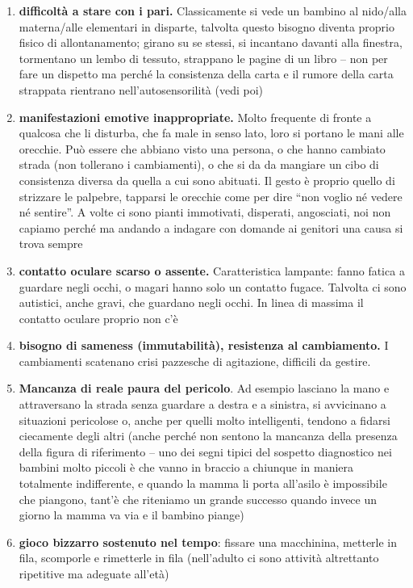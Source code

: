 \documentclass[]{article}
\begin{document}
\begin{enumerate}
\def\labelenumi{\arabic{enumi}.}
\item
  \textbf{difficoltà a stare con i pari.} Classicamente si vede un
  bambino al nido/alla materna/alle elementari in disparte, talvolta
  questo bisogno diventa proprio fisico di allontanamento; girano su se
  stessi, si incantano davanti alla finestra, tormentano un lembo di
  tessuto, strappano le pagine di un libro -- non per fare un dispetto
  ma perché la consistenza della carta e il rumore della carta strappata
  rientrano nell'autosensorilità (vedi poi)
\item
  \textbf{manifestazioni emotive inappropriate.} Molto frequente di
  fronte a qualcosa che li disturba, che fa male in senso lato, loro si
  portano le mani alle orecchie. Può essere che abbiano visto una
  persona, o che hanno cambiato strada (non tollerano i cambiamenti), o
  che si da da mangiare un cibo di consistenza diversa da quella a cui
  sono abituati. Il gesto è proprio quello di strizzare le palpebre,
  tapparsi le orecchie come per dire ``non voglio né vedere né
  sentire''. A volte ci sono pianti immotivati, disperati, angosciati,
  noi non capiamo perché ma andando a indagare con domande ai genitori
  una causa si trova sempre
\item
  \textbf{contatto oculare scarso o assente.} Caratteristica lampante:
  fanno fatica a guardare negli occhi, o magari hanno solo un contatto
  fugace. Talvolta ci sono autistici, anche gravi, che guardano negli
  occhi. In linea di massima il contatto oculare proprio non c'è
\item
  \textbf{bisogno di sameness (immutabilità), resistenza al
  cambiamento.} I cambiamenti scatenano crisi pazzesche di agitazione,
  difficili da gestire.
\item
  \textbf{Mancanza di reale paura del pericolo}. Ad esempio lasciano la
  mano e attraversano la strada senza guardare a destra e a sinistra, si
  avvicinano a situazioni pericolose o, anche per quelli molto
  intelligenti, tendono a fidarsi ciecamente degli altri (anche perché
  non sentono la mancanza della presenza della figura di riferimento --
  uno dei segni tipici del sospetto diagnostico nei bambini molto
  piccoli è che vanno in braccio a chiunque in maniera totalmente
  indifferente, e quando la mamma li porta all'asilo è impossibile che
  piangono, tant'è che riteniamo un grande successo quando invece un
  giorno la mamma va via e il bambino piange)
\item
  \textbf{gioco bizzarro sostenuto nel tempo}: fissare una macchinina,
  metterle in fila, scomporle e rimetterle in fila (nell'adulto ci sono
  attività altrettanto ripetitive ma adeguate all'età)
\end{enumerate}
\end{document}
